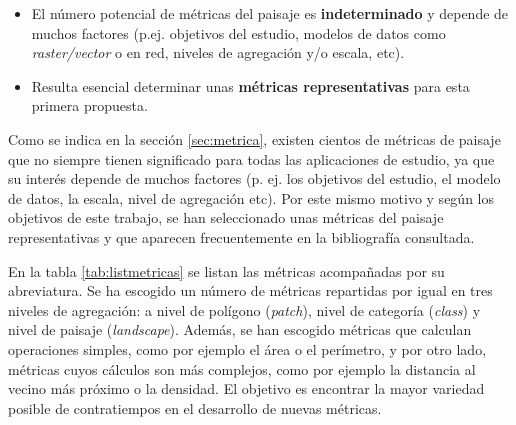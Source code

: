 \begin{graybox}
\begin{itemize}
\item El número potencial de métricas del paisaje es \textbf{indeterminado} y depende de muchos factores (p.ej. objetivos del estudio, modelos de datos como \textit{raster/vector} o en red, niveles de agregación y/o escala, etc).
\item Resulta esencial determinar unas \textbf{métricas representativas} para esta primera propuesta.
\end{itemize}
\end{graybox}

Como se indica en la sección \ref{sec:metrica}, existen cientos de métricas de paisaje que no siempre tienen significado para todas las aplicaciones de estudio, ya que su interés depende de muchos factores (p. ej. los objetivos del estudio, el modelo de datos, la escala, nivel de agregación etc). Por este mismo motivo y según los objetivos de este trabajo, se han seleccionado unas métricas del paisaje representativas y que aparecen frecuentemente en la bibliografía consultada.

En la tabla \ref{tab:listmetricas} se listan las métricas acompañadas por su abreviatura. Se ha escogido un número de métricas repartidas por igual en tres niveles de agregación: a nivel de polígono (\textit{patch}), nivel de categoría (\textit{class}) y nivel de paisaje (\textit{landscape}). Además, se han escogido métricas que calculan operaciones simples, como por ejemplo el área o el perímetro, y por otro lado, métricas cuyos cálculos son más complejos, como por ejemplo la distancia al vecino más próximo o la densidad. El objetivo es encontrar la mayor variedad posible de contratiempos en el desarrollo de nuevas métricas.

